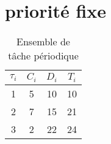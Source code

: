 \documentclass{book}
\begin{document}
\section{priorité fixe}
\begin{table}[!h]
\begin{center}
\begin{tabular}{|c|c|c|c|}
 \hline$\tau_i$ & $C_i$ & $D_i$ & $T_i$ \\ 
 \hline1 & 5 & 10 & 10 \\ 
 \hline 2 & 7 & 15 & 21 \\ 
 \hline 3 & 2 & 22 & 24 \\ 
 \hline 
 \end{tabular}
\end{center}
\caption{Ensemble de tâche périodique} \label{tab:dmmp}
\end{table}
\end{document}
